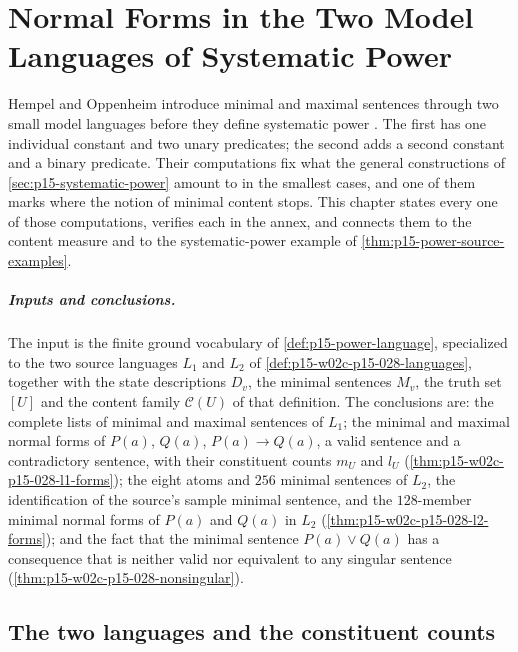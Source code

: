 \chapter{Normal Forms in the Two Model Languages of Systematic Power}
\label{sec:p15-w02c-p15-028-model-languages}

Hempel and Oppenheim introduce minimal and maximal sentences through
two small model languages before they define systematic power
\cite[pp.~166--169]{HempelOppenheim1948Explanation}. The first has one
individual constant and two unary predicates; the second adds a second
constant and a binary predicate. Their computations fix what the
general constructions of \cref{sec:p15-systematic-power} amount to in
the smallest cases, and one of them marks where the notion of minimal
content stops. This chapter states every one of those computations,
verifies each in the annex, and connects them to the content measure
and to the systematic-power example of
\cref{thm:p15-power-source-examples}.

\paragraph{Inputs and conclusions.}
The input is the finite ground vocabulary of
\cref{def:p15-power-language}, specialized to the two source languages
\(L_1\) and \(L_2\) of \cref{def:p15-w02c-p15-028-languages}, together
with the state descriptions \(D_v\), the minimal sentences \(M_v\), the
truth set \([U]\) and the content family \(\mathcal C(U)\) of that
definition. The conclusions are:
the complete lists of minimal and maximal sentences of \(L_1\); the
minimal and maximal normal forms of \(P(a)\), \(Q(a)\),
\(P(a)\to Q(a)\), a valid sentence and a contradictory sentence, with
their constituent counts \(m_U\) and \(l_U\)
(\cref{thm:p15-w02c-p15-028-l1-forms}); the eight atoms and
\(256\) minimal sentences of \(L_2\), the identification of the
source's sample minimal sentence, and the \(128\)-member minimal normal
forms of \(P(a)\) and \(Q(a)\) in \(L_2\)
(\cref{thm:p15-w02c-p15-028-l2-forms}); and the fact that the minimal
sentence \(P(a)\lor Q(a)\) has a consequence that is neither valid nor
equivalent to any singular sentence
(\cref{thm:p15-w02c-p15-028-nonsingular}).

\section{The two languages and the constituent counts}
\label{sec:p15-w02c-p15-028-counts}

